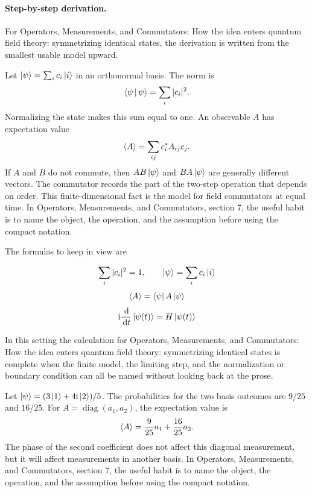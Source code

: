 \paragraph{Step-by-step derivation.}

For Operators, Measurements, and Commutators: How the idea enters quantum field theory: symmetrizing identical states, the derivation is written from the smallest usable model upward.

Let \(\left|\psi\right\rangle=\sum_i c_i\left|i\right\rangle\) in an orthonormal basis.  The norm is
\[
  \left\langle \psi\,\middle|\,\psi\right\rangle=\sum_i |c_i|^2.
\]
Normalizing the state makes this sum equal to one.  An observable \(A\) has expectation value
\[
  \left\langle A\right\rangle=\sum_{ij}c_i^*A_{ij}c_j.
\]
If \(A\) and \(B\) do not commute, then \(AB\left|\psi\right\rangle\) and \(BA\left|\psi\right\rangle\) are generally different vectors.  The commutator records the part of the two-step operation that depends on order.  This finite-dimensional fact is the model for field commutators at equal time.  In Operators, Measurements, and Commutators, section 7, the useful habit is to name the object, the operation, and the assumption before using the compact notation.

The formulas to keep in view are

\[
  \sum_i |c_i|^2=1,\qquad \left|\psi\right\rangle=\sum_i c_i\left|i\right\rangle
\]
\[
  \left\langle A\right\rangle=\left\langle \psi\right|A\left|\psi\right\rangle
\]
\[
  \mathrm i\frac{\,\mathrm d}{\,\mathrm d t}\left|\psi(t)\right\rangle=H\left|\psi(t)\right\rangle
\]

In this setting the calculation for Operators, Measurements, and Commutators: How the idea enters quantum field theory: symmetrizing identical states is complete when the finite model, the limiting step, and the normalization or boundary condition can all be named without looking back at the prose.




\begin{example}
Let \(\left|\psi\right\rangle=(3\left|1\right\rangle+4\mathrm i\left|2\right\rangle)/5\).  The probabilities for the two basis outcomes are \(9/25\) and \(16/25\).  For \(A=\operatorname{diag}(a_1,a_2)\), the expectation value is
\[
  \left\langle A\right\rangle=\frac{9}{25}a_1+\frac{16}{25}a_2.
\]
The phase of the second coefficient does not affect this diagonal measurement, but it will affect measurements in another basis.  In Operators, Measurements, and Commutators, section 7, the useful habit is to name the object, the operation, and the assumption before using the compact notation.
\end{example}



